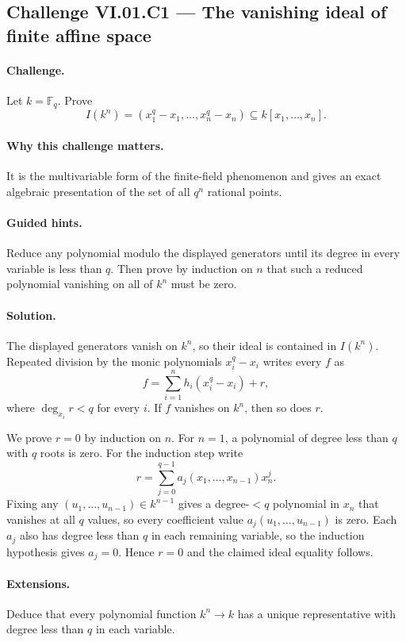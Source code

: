 \subsection*{Challenge VI.01.C1 --- The vanishing ideal of finite affine space}
\label{chal:vi01-c1}

\paragraph{Challenge.}
Let \(k=\mathbb F_q\).  Prove
\[
I(k^n)=
(x_1^q-x_1,\dots,x_n^q-x_n)
\subseteq k[x_1,\dots,x_n].
\]

\ifdefined\FullProblemDossiers
\paragraph{Why this challenge matters.}
It is the multivariable form of the finite-field phenomenon and gives an exact algebraic
presentation of the set of all \(q^n\) rational points.

\paragraph{Guided hints.}
Reduce any polynomial modulo the displayed generators until its degree in every variable is
less than \(q\).  Then prove by induction on \(n\) that such a reduced polynomial vanishing
on all of \(k^n\) must be zero.

\paragraph{Solution.}
The displayed generators vanish on \(k^n\), so their ideal is contained in \(I(k^n)\).
Repeated division by the monic polynomials \(x_i^q-x_i\) writes every \(f\) as
\[
f=\sum_{i=1}^n h_i(x_i^q-x_i)+r,
\]
where \(\deg_{x_i}r<q\) for every \(i\).  If \(f\) vanishes on \(k^n\), then so does
\(r\).

We prove \(r=0\) by induction on \(n\).  For \(n=1\), a polynomial of degree less than
\(q\) with \(q\) roots is zero.  For the induction step write
\[
r=\sum_{j=0}^{q-1}a_j(x_1,\dots,x_{n-1})x_n^j.
\]
Fixing any \((u_1,\dots,u_{n-1})\in k^{n-1}\) gives a degree-\(<q\) polynomial in \(x_n\)
that vanishes at all \(q\) values, so every coefficient value
\(a_j(u_1,\dots,u_{n-1})\) is zero.  Each \(a_j\) also has degree less than \(q\) in each
remaining variable, so the induction hypothesis gives \(a_j=0\).  Hence \(r=0\) and the
claimed ideal equality follows.

\paragraph{Extensions.}
Deduce that every polynomial function \(k^n\to k\) has a unique representative with degree
less than \(q\) in each variable.
\fi
